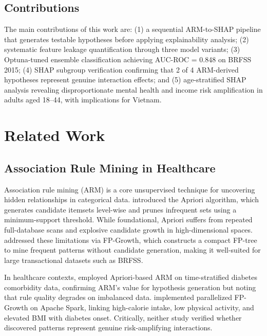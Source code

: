 ﻿\documentclass[12pt,a4paper]{article}
\begin{document}
\subsection{Contributions}

The main contributions of this work are: (1) a sequential ARM-to-SHAP pipeline that
generates testable hypotheses before applying explainability analysis; (2) systematic
feature leakage quantification through three model variants; (3) Optuna-tuned ensemble
classification achieving AUC-ROC = 0.848 on BRFSS 2015; (4) SHAP subgroup verification
confirming that 2 of 4 ARM-derived hypotheses represent genuine interaction effects;
and (5) age-stratified SHAP analysis revealing disproportionate mental health and income
risk amplification in adults aged 18--44, with implications for Vietnam.

\section{Related Work}

\subsection{Association Rule Mining in Healthcare}

Association rule mining (ARM) is a core unsupervised technique for uncovering hidden
relationships in categorical data. \citet{Agrawal1994} introduced the Apriori algorithm,
which generates candidate itemsets level-wise and prunes infrequent sets using a minimum-support
threshold. While foundational, Apriori suffers from repeated full-database scans and explosive
candidate growth in high-dimensional spaces. \citet{Han2000} addressed these limitations via
FP-Growth, which constructs a compact FP-tree to mine frequent patterns without candidate
generation, making it well-suited for large transactional datasets such as BRFSS.

In healthcare contexts, \citet{Bata2025} employed Apriori-based ARM on time-stratified
diabetes comorbidity data, confirming ARM's value for hypothesis generation but noting that
rule quality degrades on imbalanced data. \citet{Fakir2024} implemented parallelized FP-Growth
on Apache Spark, linking high-calorie intake, low physical activity, and elevated BMI with
diabetes onset. Critically, neither study verified whether discovered patterns represent
genuine risk-amplifying interactions.
\end{document}
